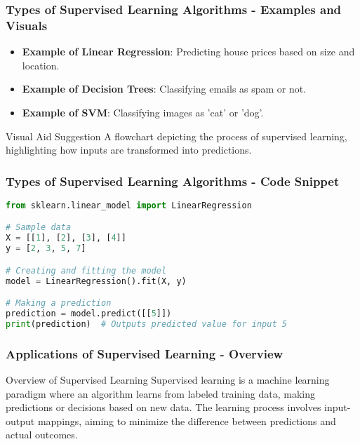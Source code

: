\documentclass{beamer}
\begin{document}
\begin{frame}[fragile]
    \frametitle{Types of Supervised Learning Algorithms - Examples and Visuals}
    \begin{itemize}
        \item \textbf{Example of Linear Regression}: Predicting house prices based on size and location.
        \item \textbf{Example of Decision Trees}: Classifying emails as spam or not.
        \item \textbf{Example of SVM}: Classifying images as 'cat' or 'dog'.
    \end{itemize}
    \begin{block}{Visual Aid Suggestion}
        A flowchart depicting the process of supervised learning, highlighting how inputs are transformed into predictions.
    \end{block}
\end{frame}

\begin{frame}[fragile]
    \frametitle{Types of Supervised Learning Algorithms - Code Snippet}
    \begin{lstlisting}[language=Python]
from sklearn.linear_model import LinearRegression

# Sample data
X = [[1], [2], [3], [4]]
y = [2, 3, 5, 7]

# Creating and fitting the model
model = LinearRegression().fit(X, y)

# Making a prediction
prediction = model.predict([[5]])
print(prediction)  # Outputs predicted value for input 5
    \end{lstlisting}
\end{frame}

\begin{frame}[fragile]
    \frametitle{Applications of Supervised Learning - Overview}
    \begin{block}{Overview of Supervised Learning}
        Supervised learning is a machine learning paradigm where an algorithm learns from labeled training data, making predictions or decisions based on new data. The learning process involves input-output mappings, aiming to minimize the difference between predictions and actual outcomes.
    \end{block}
\end{frame}
\end{document}
